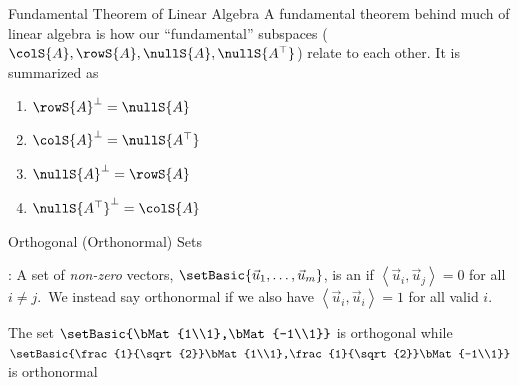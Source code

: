 \documentclass[xcoler=dvipsnames, aspectratio=169]{beamer}
\newcommand{\ip}[2]{\left\langle #1,#2\right\rangle}
\begin{document}
    \begin{frame}{Fundamental Theorem of Linear Algebra}
        A fundamental theorem behind much of linear algebra is how our ``fundamental'' subspaces
        ($\colS{A},\rowS{A},\nullS{A},\nullS{A^\top}$) relate to each other. It is summarized as
        \begin{enumerate}
            \pause\item $\rowS{A}^\perp = \nullS{A}$
            \pause\item $\colS{A}^\perp = \nullS{A^\top}$
            \pause\item $\nullS{A}^\perp = \rowS{A}$
            \pause\item $\nullS{A^\top}^\perp = \colS{A}$
        \end{enumerate}
    \end{frame}
    \begin{frame}{Orthogonal (Orthonormal) Sets}
        \begin{defn}
            : A set of \emph{non-zero} vectors,
            $\setBasic{\vec{u}_1,\dots,\vec{u}_m}$, is an  if
            $\ip{\vec{u}_i}{\vec{u}_j}=0$ for all $i\neq j$.\pause\ We instead say orthonormal
            if we also have $\ip{\vec{u}_i}{\vec{u}_i}=1$ for all valid $i$.
        \end{defn}
        \begin{example}
            The set $\setBasic{\bMat{1\\1},\bMat{-1\\1}}$ is orthogonal while
            $\setBasic{\frac{1}{\sqrt{2}}\bMat{1\\1},\frac{1}{\sqrt{2}}\bMat{-1\\1}}$ is orthonormal
        \end{example}
    \end{frame}
\end{document}
